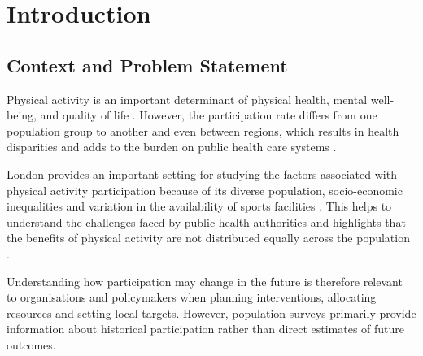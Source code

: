 \documentclass[ %
                    author={Ashrey Ashrey, Sanya Kapoor, Trisha Sharma, Yash Bhooshan Pandloskar},
                supervisor={Dr. Dalila O’Grady},
                    degree={MSc},
                     title={Using machine learning to forecast physical activity participation, volunteering and activity patterns in London},
                  subtitle={},
                      type={},
                      year={2021}]{dissertation}
\begin{document}

%

\mainmatter

\chapter{Introduction}
\label{chap:introduction}

\section{Context and Problem Statement}

Physical activity is an important determinant of physical health, mental well-being, and quality of life \cite{who_physical_activity_2024}. However, the participation rate differs from one population group to another and even between regions, which results in health disparities and adds to the burden on public health care systems \cite{who_physical_activity_2024}.

London provides an important setting for studying the factors associated with physical activity participation because of its diverse population, socio-economic inequalities and variation in the availability of sports facilities \cite{sport_england_active_lives,brainard_etal_2019}. This helps to understand the challenges faced by public health authorities and highlights that the benefits of physical activity are not distributed equally across the population \cite{brainard_etal_2019,brinkley_etal_2024}.

Understanding how participation may change in the future is therefore relevant to organisations and policymakers when planning interventions, allocating resources and setting local targets. However, population surveys primarily provide information about historical participation rather than direct estimates of future outcomes.
\end{document}
